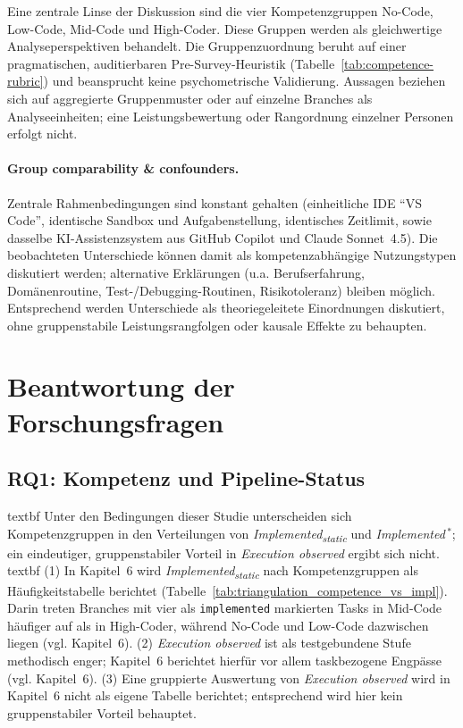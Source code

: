 Eine zentrale Linse der Diskussion sind die vier Kompetenzgruppen No-Code, Low-Code, Mid-Code und High-Coder.
Diese Gruppen werden als gleichwertige Analyseperspektiven behandelt.
Die Gruppenzuordnung beruht auf einer pragmatischen, auditierbaren Pre-Survey-Heuristik (Tabelle~\ref{tab:competence-rubric}) und beansprucht keine psychometrische Validierung.
Aussagen beziehen sich auf aggregierte Gruppenmuster oder auf einzelne Branches als Analyseeinheiten; eine Leistungsbewertung oder Rangordnung einzelner Personen erfolgt nicht.

\paragraph{Group comparability \& confounders.}
Zentrale Rahmenbedingungen sind konstant gehalten (einheitliche IDE \enquote{VS Code}, identische Sandbox und Aufgabenstellung, identisches Zeitlimit, sowie dasselbe KI-Assistenzsystem aus GitHub Copilot und Claude Sonnet~4.5).
Die beobachteten Unterschiede können damit als kompetenzabhängige Nutzungstypen diskutiert werden; alternative Erklärungen (u.a. Berufserfahrung, Domänenroutine, Test-/Debugging-Routinen, Risikotoleranz) bleiben möglich.
Entsprechend werden Unterschiede als theoriegeleitete Einordnungen diskutiert, ohne gruppenstabile Leistungsrangfolgen oder kausale Effekte zu behaupten.

\section{Beantwortung der Forschungsfragen}
\label{sec:discussion_rq_answers}

\subsection*{RQ1: Kompetenz und Pipeline-Status}
	\csname textbf Unter den Bedingungen dieser Studie unterscheiden sich Kompetenzgruppen in den Verteilungen von  \textit{Implemented\textsubscript{static}} und  \textit{Implemented}\,$^\ast$; ein eindeutiger, gruppenstabiler Vorteil in  \textit{Execution observed} ergibt sich nicht.
	\csname textbf (1) In Kapitel~6 wird \textit{Implemented\textsubscript{static}} nach Kompetenzgruppen als Häufigkeitstabelle berichtet (Tabelle~\ref{tab:triangulation_competence_vs_impl}). Darin treten Branches mit vier als \texttt{implemented} markierten Tasks in Mid-Code häufiger auf als in High-Coder, während No-Code und Low-Code dazwischen liegen (vgl. Kapitel~6). (2) \textit{Execution observed} ist als testgebundene Stufe methodisch enger; Kapitel~6 berichtet hierfür vor allem taskbezogene Engpässe (vgl. Kapitel~6). (3) Eine gruppierte Auswertung von \textit{Execution observed} wird in Kapitel~6 nicht als eigene Tabelle berichtet; entsprechend wird hier kein gruppenstabiler Vorteil behauptet.

